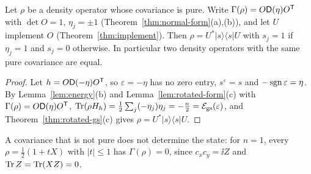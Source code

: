 \begin{corollary}\label{cor:pure-determines}
Let $\rho$ be a density operator whose covariance is pure. Write
$\Gamma(\rho)=O\mathsf D(\eta)O^{\mathsf T}$ with $\det O=1$, $\eta_j=\pm1$ (Theorem~\ref{thm:normal-form}(a),(b)),
and let $U$ implement $O$ (Theorem~\ref{thm:implement}).
Then $\rho=U^*|s\rangle\langle s|U$ with $s_j=1$ if $\eta_j=1$ and $s_j=0$ otherwise. In
particular two density operators with the same pure covariance are equal.
\end{corollary}
\begin{proof}
Let $h=O\mathsf D(-\eta)O^{\mathsf T}$, so $\varepsilon=-\eta$ has no zero entry, $s^\varepsilon=s$ and
$-\operatorname{sgn}\varepsilon=\eta$. By Lemma~\ref{lem:energy}(b) and Lemma~\ref{lem:rotated-form}(c)
with $\Gamma(\rho)=O\mathsf D(\eta)O^{\mathsf T}$,
$\operatorname{Tr}(\rho H_h)=\tfrac12\sum_j(-\eta_j)\eta_j=-\tfrac n2=\mathcal E_{\mathrm{gs}}(\varepsilon)$, and
Theorem~\ref{thm:rotated-gs}(c) gives $\rho=U^*|s\rangle\langle s|U$.
\end{proof}
\begin{remark}\label{rem:mixed-not-determined}
A covariance that is not pure does not determine the state: for $n=1$, every
$\rho=\tfrac12(1+tX)$ with $|t|\leq1$ has $\Gamma(\rho)=0$, since $c_xc_y=\ii Z$ and
$\operatorname{Tr} Z=\operatorname{Tr}(XZ)=0$.
\end{remark}
